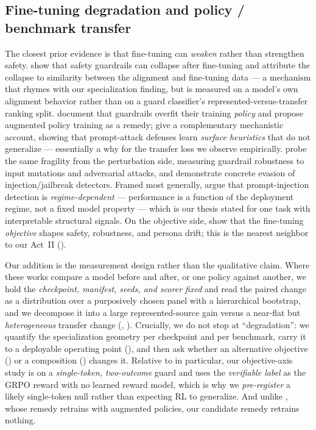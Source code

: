 \subsection{Fine-tuning degradation and policy / benchmark transfer}
\label{sec:related-transfer}
The closest prior evidence is that fine-tuning can \emph{weaken} rather than strengthen safety.
\citet{hsiung2025guardrails} show that safety guardrails can collapse after fine-tuning and attribute
the collapse to similarity between the alignment and fine-tuning data --- a mechanism that rhymes with
our specialization finding, but is measured on a model's own alignment behavior rather than on a guard
classifier's represented-versus-transfer ranking split. \citet{liu2026domaingeneralizable} document that
guardrails overfit their training \emph{policy} and propose augmented policy training as a remedy;
\citet{li2026surfaceheuristics} give a complementary mechanistic account, showing that prompt-attack
defenses learn \emph{surface heuristics} that do not generalize --- essentially a why for the transfer
loss we observe empirically. \citet{bassani2025robustness} probe the same fragility from the
perturbation side, measuring guardrail robustness to input mutations and adversarial attacks, and
\citet{hackett2025bypassing} demonstrate concrete evasion of injection/jailbreak detectors. Framed most
generally, \citet{akinrele2026regime} argue that prompt-injection detection is \emph{regime-dependent} ---
performance is a function of the deployment regime, not a fixed model property --- which is our thesis
stated for one task with interpretable structural signals. On the objective side,
\citet{vennemeyer2026objective} show that the fine-tuning \emph{objective} shapes safety, robustness,
and persona drift; this is the nearest neighbor to our Act~II ().

Our addition is the measurement design rather than the qualitative claim. Where these works compare a
model before and after, or one policy against another, we hold the \emph{checkpoint, manifest, seeds,
and scorer fixed} and read the paired change as a distribution over a purposively chosen panel with a
hierarchical bootstrap, and we decompose it into a large represented-source gain versus a near-flat but
\emph{heterogeneous} transfer change (, ). Crucially, we do not stop
at ``degradation'': we quantify the specialization geometry per checkpoint and per benchmark, carry it
to a deployable operating point (), and then ask whether an alternative objective
() or a composition () changes it. Relative to
\citet{vennemeyer2026objective} in particular, our objective-axis study is on a \emph{single-token,
two-outcome} guard and uses the \emph{verifiable label} as the GRPO reward with no learned reward model,
which is why we \emph{pre-register} a likely single-token null rather than expecting RL to generalize.
And unlike \citet{liu2026domaingeneralizable}, whose remedy retrains with augmented policies, our
candidate remedy retrains nothing.

